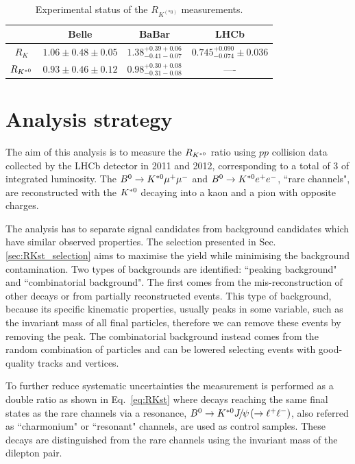 \begin{center}
\begin{table}[h!]
\centering
\caption{Experimental status of the $R_{K^{(*0)}}$ measurements. } %
\begin{tabular}{c|c|c|c}
 	& Belle 			& BaBar 		& LHCb \\
 \hline
$R_K$			& $1.06 \pm 0.48 \pm 0.05$	& $1.38^{+0.39+0.06}_{-0.41-0.07}$ & $0.745^{+0.090}_{-0.074} \pm 0.036$\\
$R_{{{K}^{*0}}}$	& $0.93 \pm 0.46 \pm 0.12$	& $0.98^{+0.30+0.08}_{-0.31-0.08}$ & ----\\
\end{tabular}
\label{tab:expstatus}
\end{table}
\end{center}


\section{Analysis strategy}

The aim of this analysis is to measure the $R_{{{K}^{*0}}}$ ratio using $pp$ collision data collected by the LHCb
detector in 2011 and 2012, corresponding to a total of 3 \invfb of integrated luminosity.
The ${{B}^0} \rightarrow {\ensuremath{{K}^{*0}}}{\ensuremath{\mu^+\mu^-}}$ and ${{B}^0} \rightarrow {\ensuremath{{K}^{*0}}}{\ensuremath{e^+e^-}}$, ``rare channels", are
reconstructed with the ${{K}^{*0}}$ decaying into a kaon and a pion with opposite charges.

The analysis has to separate signal candidates from background candidates which have similar observed properties. 
The selection presented in Sec. \ref{sec:RKst_selection} aims to maximise the yield while minimising
the background contamination. Two types of backgrounds are identified: ``peaking background" and ``combinatorial background". 
The first comes from the mis-reconstruction of other decays or from partially reconstructed events. This type 
of background,  because its specific kinematic properties, usually peaks in some variable, such as the invariant
mass of all final particles, therefore we can remove these events by removing the peak. 
The combinatorial background  instead comes from the random combination of particles and can 
be lowered selecting events with good-quality tracks and vertices.

To further reduce systematic uncertainties the measurement is performed as a double ratio as shown in
Eq.~\ref{eq:RKst} %
where decays reaching the same final states as the rare channels via a \jpsi resonance, $\Bz\to\Kstarz\jpsi(\to\ll)$,
also referred as ``charmonium" or ``resonant" channels, are used as control samples.
These decays are distinguished from the rare channels using the invariant mass of the dilepton pair.


